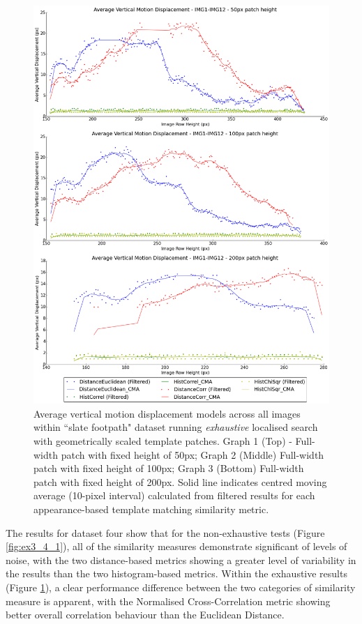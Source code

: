 \clearpage
\begin{figure}[ht!]
\centering
\includegraphics[scale=0.3]{images/results/path_outside_10cm_scaled_exhaustive}
\caption{Average vertical motion displacement models across all images within ``slate footpath" dataset running \textit{exhaustive} localised search with geometrically scaled template patches. Graph 1 (Top) - Full-width patch with fixed height of 50px; Graph 2 (Middle) Full-width patch with fixed height of 100px; Graph 3 (Bottom) Full-width patch with fixed height of 200px. Solid line indicates centred moving average (10-pixel interval) calculated from filtered results for each appearance-based template matching similarity metric.}
\label{fig:ex3_4_2}
\end{figure}

The results for dataset four show that for the non-exhaustive tests (Figure \ref{fig:ex3_4_1}), all of the similarity measures demonstrate significant of levels of noise, with the two distance-based metrics showing a greater level of variability in the results than the two histogram-based metrics. Within the exhaustive results (Figure \ref{fig:ex3_4_2}), a clear performance difference between the two categories of similarity measure is apparent, with the Normalised Cross-Correlation metric showing better overall correlation behaviour than the Euclidean Distance.


